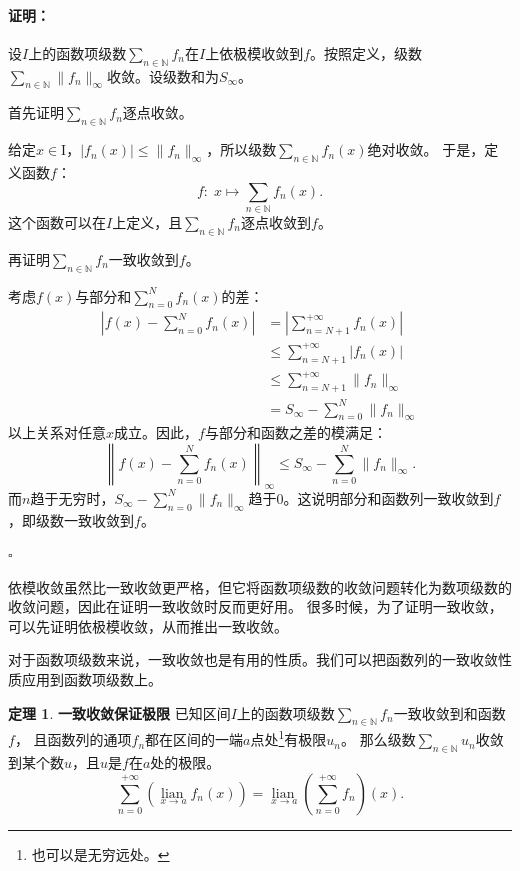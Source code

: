 \documentclass[12pt,UTF8]{ctexbook}
\newcommand{\lian}[1]{
    \underset{#1}{\operatorname{lian}\,}
}
\theoremstyle{definition}
\newtheorem{tm}{定理}[section]
\theoremstyle{plain}
\renewenvironment{proof}{\paragraph{\textbf{证明：}}}{\hfill$\square$}
\begin{document}
\begin{appendix}
\begin{proof}
    设$I$上的函数项级数$\sum_{n\in\mathbb{N}} f_n$在$I$上依极模收敛到$f$。按照定义，级数
    $\sum_{n\in\mathbb{N}} \|f_n\|_{\infty}$收敛。设级数和为$S_{\infty}$。

    首先证明$\sum_{n\in\mathbb{N}} f_n$逐点收敛。

    给定$x\in $I，$|f_n(x)| \leqslant \| f_n \|_{\infty}$，所以级数$\sum_{n\in\mathbb{N}} f_n(x)$绝对收敛。
    于是，定义函数$f$：
    $$ f : \; x\mapsto \sum_{n\in\mathbb{N}} f_n(x). $$
    这个函数可以在$I$上定义，且$\sum_{n\in\mathbb{N}} f_n$逐点收敛到$f$。

    再证明$\sum_{n\in\mathbb{N}} f_n$一致收敛到$f$。

    考虑$f(x)$与部分和$\sum_{n=0}^N f_n(x)$的差：
    \begin{align*}
        \left| f(x) - \sum_{n=0}^N f_n(x) \right| &= \left| \sum_{n=N+1}^{+\infty} f_n(x) \right| \\
        &\leqslant \sum_{n=N+1}^{+\infty} |f_n(x)| \\
        &\leqslant \sum_{n=N+1}^{+\infty} \|f_n\|_{\infty} \\
        &= S_{\infty} - \sum_{n=0}^N \|f_n\|_{\infty}
    \end{align*}
    以上关系对任意$x$成立。因此，$f$与部分和函数之差的模满足：
    $$ \left\| f(x) - \sum_{n=0}^N f_n(x) \right\|_{\infty} \leqslant S_{\infty} - \sum_{n=0}^N \|f_n\|_{\infty}. $$
    而$n$趋于无穷时，$S_{\infty} - \sum_{n=0}^N \|f_n\|_{\infty}$趋于$0$。这说明部分和函数列一致收敛到$f$，即级数一致收敛到$f$。

\end{proof}

依模收敛虽然比一致收敛更严格，但它将函数项级数的收敛问题转化为数项级数的收敛问题，因此在证明一致收敛时反而更好用。
很多时候，为了证明一致收敛，可以先证明依极模收敛，从而推出一致收敛。

对于函数项级数来说，一致收敛也是有用的性质。我们可以把函数列的一致收敛性质应用到函数项级数上。

\begin{tm}{\textbf{一致收敛保证极限}}
    已知区间$I$上的函数项级数$\sum_{n\in\mathbb{N}} f_n$一致收敛到和函数$f$，
    且函数列的通项$f_n$都在区间的一端$a$点处\footnote{也可以是无穷远处。}有极限$u_n$。
    那么级数$\sum_{n\in\mathbb{N}} u_n$收敛到某个数$u$，且$u$是$f$在$a$处的极限。
    $$ \sum_{n=0}^{+\infty} \left(\lian{x\to a} f_n(x) \right) = \lian{x\to a} \left(\sum_{n=0}^{+\infty} f_n\right)(x). $$
\end{tm}


\end{appendix}
\end{document}
